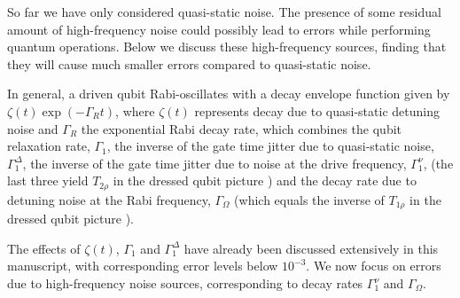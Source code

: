 \documentclass[aps,prb,superscriptaddress,nobibnotes,twocolumn]{revtex4-1}
\begin{document}
So far we have only considered quasi-static noise. The presence of some residual amount of high-frequency noise could possibly lead to errors while performing quantum operations. Below we discuss these high-frequency sources, finding that they will cause much smaller errors compared to quasi-static noise.

In general, a driven qubit Rabi-oscillates with a decay envelope function given by \cite{Bylander2011S} $\zeta(t)\exp(-\Gamma_Rt)$, where $\zeta(t)$ represents decay due to quasi-static detuning noise and $\Gamma_R$ the exponential Rabi decay rate, which combines the qubit relaxation rate, $\Gamma_1$, the inverse of the gate time jitter due to quasi-static noise, $\Gamma_1^{\Delta}$, the inverse of the gate time jitter due to noise at the drive frequency, $\Gamma_1^{\nu}$, (the last three yield $T_{2\rho}$ in the dressed qubit picture \cite{Laucht2016S}) and the decay rate due to detuning noise at the Rabi frequency, $\Gamma_\Omega$ (which equals the inverse of $T_{1\rho}$ in the dressed qubit picture \cite{Yan2013S,Laucht2016S}).

The effects of $\zeta(t)$, $\Gamma_1$ and $\Gamma_1^{\Delta}$ have already been discussed extensively in this manuscript, with corresponding error levels below $10^{-3}$. We now focus on errors due to high-frequency noise sources, corresponding to decay rates $\Gamma_1^{\nu}$ and $\Gamma_\Omega$.
\end{document}
